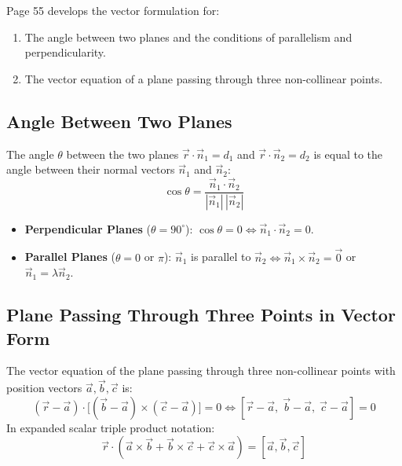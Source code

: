 \begin{conceptbox}
Page 55 develops the vector formulation for:
\begin{enumerate}[noitemsep]
    \item The angle between two planes and the conditions of parallelism and perpendicularity.
    \item The vector equation of a plane passing through three non-collinear points.
\end{enumerate}
\end{conceptbox}

\subsection{Angle Between Two Planes}
\begin{theorembox}
The angle $\theta$ between the two planes $\vec{r} \cdot \vec{n}_1 = d_1$ and $\vec{r} \cdot \vec{n}_2 = d_2$ is equal to the angle between their normal vectors $\vec{n}_1$ and $\vec{n}_2$:
\begin{equation}
    \boxed{\cos\theta = \frac{\vec{n}_1 \cdot \vec{n}_2}{|\vec{n}_1|\,|\vec{n}_2|}}
\end{equation}
\end{theorembox}

\begin{notebox}
\begin{itemize}[noitemsep]
    \item \textbf{Perpendicular Planes} ($\theta = 90^\circ$): $\cos\theta = 0 \iff \boxed{\vec{n}_1 \cdot \vec{n}_2 = 0}$.
    \item \textbf{Parallel Planes} ($\theta = 0$ or $\pi$): $\vec{n}_1$ is parallel to $\vec{n}_2 \iff \boxed{\vec{n}_1 \times \vec{n}_2 = \vec{0}}$ or $\vec{n}_1 = \lambda \vec{n}_2$.
\end{itemize}
\end{notebox}

\subsection{Plane Passing Through Three Points in Vector Form}
\begin{theorembox}
The vector equation of the plane passing through three non-collinear points with position vectors $\vec{a}, \vec{b}, \vec{c}$ is:
\begin{equation}
    \boxed{(\vec{r} - \vec{a}) \cdot \bigl[(\vec{b} - \vec{a}) \times (\vec{c} - \vec{a})\bigr] = 0 \iff [\vec{r} - \vec{a}, \; \vec{b} - \vec{a}, \; \vec{c} - \vec{a}] = 0}
\end{equation}
In expanded scalar triple product notation:
\begin{equation}
    \boxed{\vec{r} \cdot (\vec{a} \times \vec{b} + \vec{b} \times \vec{c} + \vec{c} \times \vec{a}) = [\vec{a}, \vec{b}, \vec{c}]}
\end{equation}
\end{theorembox}


